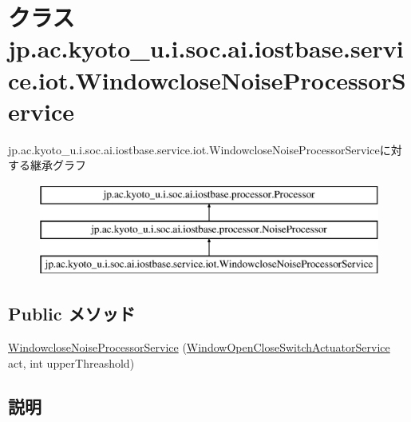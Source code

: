 \hypertarget{classjp_1_1ac_1_1kyoto__u_1_1i_1_1soc_1_1ai_1_1iostbase_1_1service_1_1iot_1_1_windowclose_noise_processor_service}{\section{クラス jp.\-ac.\-kyoto\-\_\-u.\-i.\-soc.\-ai.\-iostbase.\-service.\-iot.\-Windowclose\-Noise\-Processor\-Service}
\label{classjp_1_1ac_1_1kyoto__u_1_1i_1_1soc_1_1ai_1_1iostbase_1_1service_1_1iot_1_1_windowclose_noise_processor_service}
}
jp.\-ac.\-kyoto\-\_\-u.\-i.\-soc.\-ai.\-iostbase.\-service.\-iot.\-Windowclose\-Noise\-Processor\-Serviceに対する継承グラフ\begin{figure}[H]
\begin{center}
\leavevmode
\includegraphics[height=3.000000cm]{classjp_1_1ac_1_1kyoto__u_1_1i_1_1soc_1_1ai_1_1iostbase_1_1service_1_1iot_1_1_windowclose_noise_processor_service}
\end{center}
\end{figure}
\subsection*{Public メソッド}
\begin{DoxyCompactItemize}
\item 
\hyperlink{classjp_1_1ac_1_1kyoto__u_1_1i_1_1soc_1_1ai_1_1iostbase_1_1service_1_1iot_1_1_windowclose_noise_processor_service_a7e08397b1104738d5c68f7de19f53e9b}{Windowclose\-Noise\-Processor\-Service} (\hyperlink{classjp_1_1ac_1_1kyoto__u_1_1i_1_1soc_1_1ai_1_1iostbase_1_1service_1_1iot_1_1_window_open_close_switch_actuator_service}{Window\-Open\-Close\-Switch\-Actuator\-Service} act, int upper\-Threashold)
\end{DoxyCompactItemize}


\subsection{説明}


